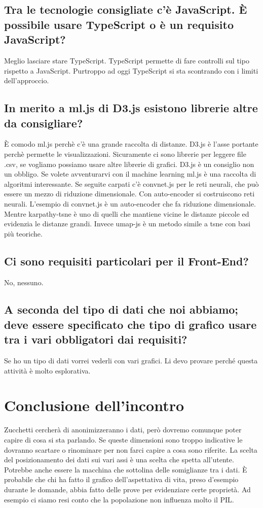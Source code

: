 \documentclass{article}
\begin{document}
    \subsection{Tra le tecnologie consigliate c'è JavaScript. È possibile usare TypeScript o è un requisito JavaScript?}
    \label{sub:domanda_16}
    Meglio lasciare stare TypeScript. TypeScript permette di fare controlli sul tipo rispetto a JavaScript. Purtroppo ad oggi TypeScript si sta scontrando con i limiti dell'approccio.

    \subsection{In merito a ml.js di D3.js esistono librerie altre da consigliare?}
    \label{sub:domanda_17}
    È comodo ml.js perchè c'è una grande raccolta di distanze. D3.js è l'asse portante perchè permette le visualizzazioni. Sicuramente ci sono librerie per leggere file .csv, se vogliamo possiamo usare altre librerie di grafici. D3.js è un consiglio non un obbligo. Se volete avventurarvi con il machine learning ml.js è una raccolta di algoritmi interessante. Se seguite carpati c'è convnet.js per le reti neurali, che può essere un mezzo di riduzione dimensionale. Con auto-encoder si costruiscono reti neurali. L'esempio di convnet.js è un auto-encoder che fa riduzione dimensionale. Mentre karpathy-tsne è uno di quelli che mantiene vicine le distanze piccole ed evidenzia le distanze grandi. Invece umap-js è un metodo simile a tsne con basi più teoriche. 

    \subsection{Ci sono requisiti particolari per il Front-End?}
    \label{sub:domanda_18}
    No, nessuno.

    \subsection{A seconda del tipo di dati che noi abbiamo; deve essere specificato che tipo di grafico usare tra i vari obbligatori dai requisiti?}
    \label{sub:domanda_19}
    Se ho un tipo di dati vorrei vederli con vari grafici. Li devo provare perché questa attività è molto esplorativa.

\section{Conclusione dell'incontro}
\label{sec:conclusione}
Zucchetti cercherà di anonimizzeranno i dati, però dovremo comunque poter capire di cosa si sta parlando. Se queste dimensioni sono troppo indicative le dovranno scartare o rinominare per non farci capire a cosa sono riferite. La scelta del posizionamento dei dati sui vari assi è una scelta che spetta all'utente. Potrebbe anche essere la macchina che sottolina delle somiglianze tra i dati. È probabile che chi ha fatto il grafico dell'aspettativa di vita, preso d'esempio durante le domande, abbia fatto delle prove per evidenziare certe proprietà. Ad esempio ci siamo resi conto che la popolazione non influenza molto il PIL.
\end{document}
